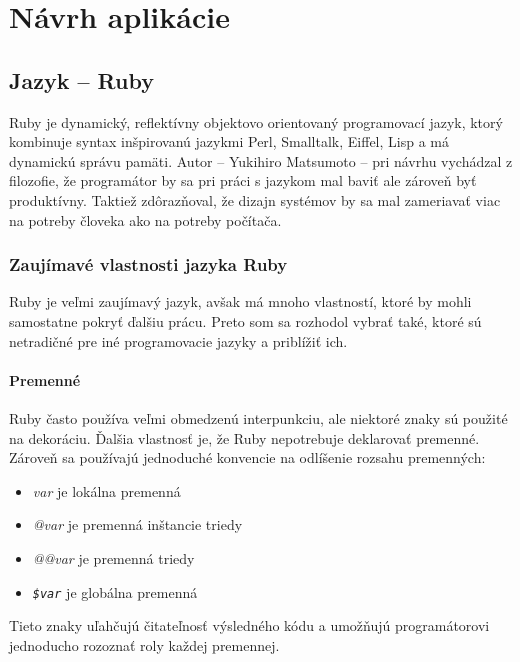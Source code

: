 \chapter{Návrh aplikácie}

\section{Jazyk -- Ruby}

Ruby je dynamický, reflektívny objektovo orientovaný programovací jazyk, ktorý kombinuje syntax inšpirovanú jazykmi Perl, Smalltalk, Eiffel, Lisp a má dynamickú správu pamäti. Autor -- Yukihiro Matsumoto -- pri návrhu vychádzal z filozofie, že programátor by sa pri práci s jazykom mal baviť ale zároveň byť produktívny. Taktiež zdôrazňoval, že dizajn systémov by sa mal zameriavať viac na potreby človeka ako na potreby počítača. \citep{matsumoto2002ruby}

\subsection{Zaujímavé vlastnosti jazyka Ruby}

Ruby je veľmi zaujímavý jazyk, avšak má mnoho vlastností, ktoré by mohli samostatne pokryť ďalšiu prácu. Preto som sa rozhodol vybrať také, ktoré sú netradičné pre iné programovacie jazyky a priblížiť ich.

\clearpage
\subsubsection{Premenné}

Ruby často používa veľmi obmedzenú interpunkciu, ale niektoré znaky sú použité na dekoráciu. Ďalšia vlastnosť je, že Ruby nepotrebuje deklarovať premenné. Zároveň sa používajú jednoduché konvencie na odlíšenie rozsahu premenných:

\begin{itemize}
    \item \emph{var} je lokálna premenná
    \item \emph{@var} je premenná inštancie triedy
    \item \emph{@@var} je premenná triedy
    \item \emph{\texttt{\$var}} je globálna premenná
\end{itemize}

Tieto znaky uľahčujú čitateľnosť výsledného kódu a umožňujú programátorovi jednoducho rozoznať roly každej premennej. \citep{web:rubylang}

